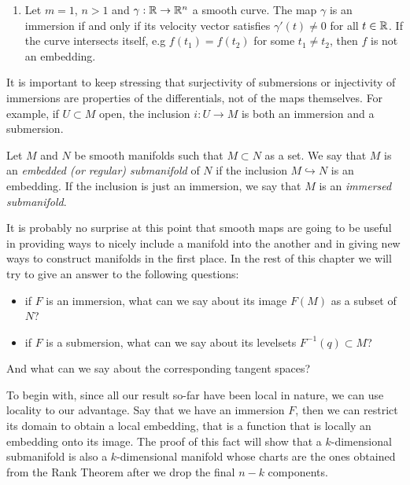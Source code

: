 \begin{example}
\begin{enumerate}
    \item Let $m=1$, $n > 1$ and $\gamma:\mathbb{R}\to\mathbb{R}^n$ a smooth curve.
          The map $\gamma$ is an immersion if and only if its velocity vector satisfies $\gamma'(t)\neq0$ for all $t\in\mathbb{R}$.
          If the curve intersects itself, e.g $f(t_1) = f(t_2)$ for some $t_1\neq t_2$, then $f$ is not an embedding.
  \end{enumerate}
\end{example}

\begin{remark}
  It is important to keep stressing that surjectivity of submersions or injectivity of immersions are properties of the differentials, not of the maps themselves.
  For example, if $U\subset M$ open, the inclusion $i: U \to M$ is both an immersion and a submersion.
\end{remark}

\begin{definition}
  Let $M$ and $N$ be smooth manifolds such that $M\subset N$ as a set.
  We say that $M$ is an \emph{embedded (or regular) submanifold} of $N$ if the inclusion $M\hookrightarrow N$ is an embedding. If the inclusion is just an immersion, we say that $M$ is an \emph{immersed submanifold}.
\end{definition}

It is probably no surprise at this point that smooth maps are going to be useful in providing ways to nicely include a manifold into the another and in giving new ways to construct manifolds in the first place.
In the rest of this chapter we will try to give an answer to the following questions:
\begin{itemize}
  \item if $F$ is an immersion, what can we say about its image $F(M)$ as a subset of $N$?
  \item if $F$ is a submersion, what can we say about its levelsets $F^{-1}(q) \subset M$?
\end{itemize}
And what can we say about the corresponding tangent spaces?


To begin with, since all our result so-far have been local in nature, we can use locality to our advantage.
Say that we have an immersion $F$, then we can restrict its domain to obtain a local embedding, that is
a function that is locally an embedding onto its image.
The proof of this fact will show that a $k$-dimensional submanifold is also a $k$-dimensional manifold
whose charts are the ones obtained from the Rank Theorem after we drop the final $n-k$ components.

